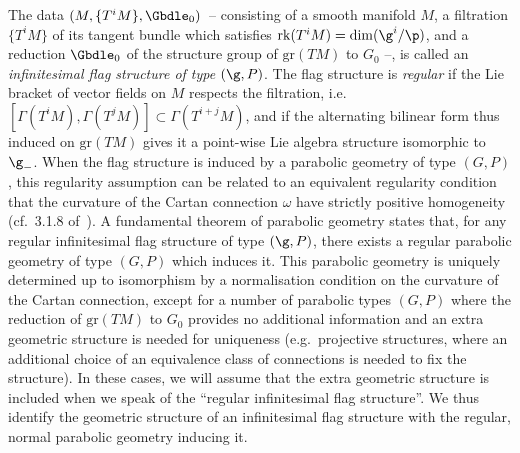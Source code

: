 The data $(M,\{T^iM\},\Gbdle_0)$~-- consisting of a smooth manifold $M$, a f\/iltration $\{T^iM\}$ of its tangent bundle which satisf\/ies $\mathrm{rk}(T^iM) = \mathrm{dim}(\g^i/\p)$, and a reduction $\Gbdle_0$ of the structure group of $\mathrm{gr}(TM)$ to $G_0$ --, is called an \emph{infinitesimal flag structure of type} $(\g,P)$. The f\/lag structure is \emph{regular} if the Lie bracket of vector f\/ields on $M$ respects the f\/iltration, i.e.\ $[\Gamma(T^iM),\Gamma(T^jM)] \subset \Gamma(T^{i+j}M)$, and if the alternating bilinear form thus induced on $\mathrm{gr}(TM)$ gives it a point-wise Lie algebra structure isomorphic to $\g_-$. When the f\/lag structure is induced by a parabolic geometry of type $(G,P)$, this regularity assumption can be related to an equivalent regularity condition that the curvature of the Cartan connection $\omega$ have strictly positive homogeneity (cf.~3.1.8 of~\cite{CSbook}). A fundamental theorem of parabolic geometry states that, for any regular inf\/initesimal f\/lag structure of type $(\g,P)$, there exists a regular parabolic geometry of type $(G,P)$ which induces it. This parabolic geometry is uniquely determined up to isomorphism by a normalisation condition on the curvature of the Cartan connection, except for a number of parabolic types $(G,P)$ where the reduction of $\mathrm{gr}(TM)$ to $G_0$ provides no additional information and an extra geometric structure is needed for uniqueness (e.g.\ projective structures, where an additional choice of an equivalence class of connections is needed to f\/ix the structure). In these cases, we will assume that the extra geometric structure is included when we speak of the ``regular inf\/initesimal f\/lag structure''. We thus identify the geometric structure of an inf\/initesimal f\/lag structure with the regular, normal parabolic geometry inducing it.

